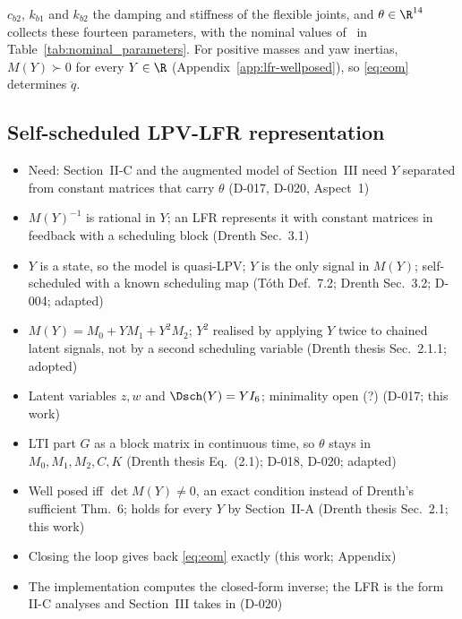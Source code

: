 $c_{b2}$, $k_{b1}$ and $k_{b2}$ the damping and stiffness of the flexible
joints, and $\theta\in\R^{14}$ collects these fourteen parameters, with the
nominal values of~\cite[Table~I]{garcia2013model} in
Table~\ref{tab:nominal_parameters}.
For positive masses and yaw inertias, $M(Y)\succ0$ for every $Y\in\R$
(Appendix~\ref{app:lfr-wellposed}), so \eqref{eq:eom} determines $\ddot q$.

\subsection{Self-scheduled LPV-LFR representation}\label{sec:lfr}
\ifdraft
\begin{itemize}
\item Need: Section~II-C and the augmented model of Section~III need $Y$ separated from constant matrices that carry $\theta$ (D-017, D-020, Aspect~1)
\item $M(Y)^{-1}$ is rational in $Y$; an LFR represents it with constant matrices in feedback with a scheduling block (Drenth Sec.~3.1)
\item $Y$ is a state, so the model is quasi-LPV; $Y$ is the only signal in $M(Y)$; self-scheduled with a known scheduling map (T\'oth Def.~7.2; Drenth Sec.~3.2; D-004; adapted)
\item $M(Y)=M_0+YM_1+Y^2M_2$; $Y^2$ realised by applying $Y$ twice to chained latent signals, not by a second scheduling variable (Drenth thesis Sec.~2.1.1; adopted)
\item Latent variables $z,w$ and $\Dsch(Y)=YI_6$; minimality open (?) (D-017; this work)
\item LTI part $G$ as a block matrix in continuous time, so $\theta$ stays in $M_0,M_1,M_2,C,K$ (Drenth thesis Eq.~(2.1); D-018, D-020; adapted)
\item Well posed iff $\det M(Y)\neq0$, an exact condition instead of Drenth's sufficient Thm.~6; holds for every $Y$ by Section~II-A (Drenth thesis Sec.~2.1; this work)
\item Closing the loop gives back \eqref{eq:eom} exactly (this work; Appendix)
\item The implementation computes the closed-form inverse; the LFR is the form II-C analyses and Section~III takes in (D-020)
\end{itemize}
\fi

